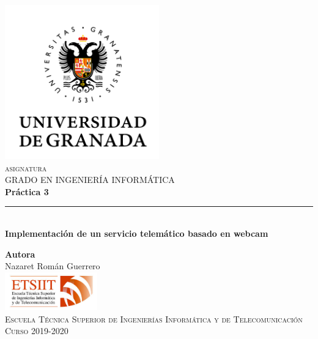 \documentclass[11pt,a4paper]{article}
\begin{document}
\begin{titlepage}

\begin{minipage}{\textwidth}

\centering
\includegraphics[width=0.5\textwidth]{logo.png}\\

\textsc{\Large asignatura\\[0.2cm]}
\textsc{GRADO EN INGENIERÍA INFORMÁTICA}\\[1cm]

{\Huge\bfseries Práctica 3\\}
\noindent\rule[-1ex]{\textwidth}{3pt}\\[3.5ex]
{\large\bfseries Implementación de un servicio telemático basado en webcam}
\end{minipage}

\vspace{1.5cm}
\begin{minipage}{\textwidth}
\centering

\textbf{Autora}\\ {Nazaret Román Guerrero}\\[2.5ex]
\includegraphics[width=0.3\textwidth]{etsiit.jpeg}\\[0.1cm]
\vspace{1cm}
\textsc{Escuela Técnica Superior de Ingenierías Informática y de Telecomunicación}\\
\vspace{1cm}
\textsc{Curso 2019-2020}
\end{minipage}
\end{titlepage}

\tableofcontents
\thispagestyle{empty}
\end{document}
